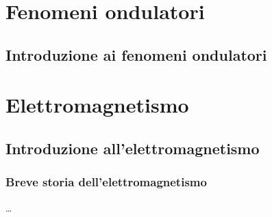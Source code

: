 \documentclass[letterpaper,10pt,italian]{jupyterBook}
\begin{document}
\sphinxstepscope


\part{Fenomeni ondulatori}

\sphinxstepscope


\chapter{Introduzione ai fenomeni ondulatori}
\label{\detokenize{ch/waves/intro:introduzione-ai-fenomeni-ondulatori}}\label{\detokenize{ch/waves/intro:physics-hs-waves-intro}}\label{\detokenize{ch/waves/intro::doc}}
\sphinxstepscope


\part{Elettromagnetismo}

\sphinxstepscope


\chapter{Introduzione all’elettromagnetismo}
\label{\detokenize{ch/electromagnetism/intro:introduzione-all-elettromagnetismo}}\label{\detokenize{ch/electromagnetism/intro:physics-hs-electromagnetism-intro}}\label{\detokenize{ch/electromagnetism/intro::doc}}
\sphinxstepscope


\section{Breve storia dell’elettromagnetismo}
\label{\detokenize{ch/electromagnetism/intro-history:breve-storia-dell-elettromagnetismo}}\label{\detokenize{ch/electromagnetism/intro-history:physics-hs-electromagnetism-intro-history}}\label{\detokenize{ch/electromagnetism/intro-history::doc}}
\sphinxAtStartPar
{}
…
\end{document}
